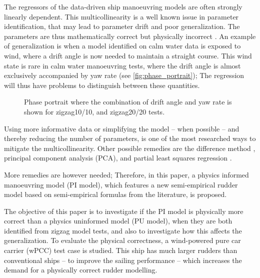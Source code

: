 %
The regressors of the data-driven ship manoeuvring models are often strongly linearly dependent. This multicollinearity is a well known issue in parameter identification, that may lead to parameter drift and poor generalization. The parameters are thus mathematically correct but physically incorrect \citep{luo_parameter_2016}. 
An example of generalization is when a model identified on calm water data is exposed to wind, where a drift angle is now needed to maintain a straight course. This wind state is rare in calm water manoeuvring tests, where the drift angle is almost exclusively accompanied by yaw rate (see \autoref{fig:phase_portrait}); 
The regression will thus have problems to distinguish between these quantities.
%
\begin{figure}[h]
  \centering
  
  \caption{Phase portrait where the combination of drift angle and yaw rate is shown for zigzag10/10, and zigzag20/20 tests.}
  \label{fig:phase_portrait}
\end{figure}
Using more informative data or simplifying the model -- when possible -- and thereby reducing the number of parameters, is one of the most researched ways to mitigate the multicollinearity. Other possible remedies are the difference method \citep{luo_parameter_2016}, principal component analysis (PCA), and partial least squares regression \citep{jian-chuan_parametric_2015}. 

More remedies are however needed; Therefore, in this paper, a physics informed manoeuvring model (PI model), which features a new semi-empirical rudder model based on semi-empirical formulas from the literature, is proposed.

The objective of this paper is to investigate if the PI model is physically more correct than a physics uninformed model (PU model), when they are both identified from zigzag model tests, and also to investigate how this affects the generalization.
To evaluate the physical correctness, a wind-powered pure car carrier (wPCC) test case is studied. 
This ship has much larger rudders than conventional ships -- to improve the sailing performance -- 
which increases the demand for a physically correct rudder modelling.

